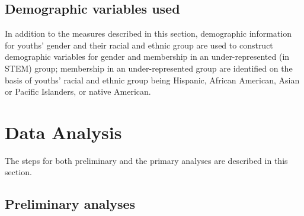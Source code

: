 \documentclass[]{book}
\theoremstyle{definition}
\theoremstyle{definition}
\theoremstyle{definition}
\theoremstyle{remark}
\begin{document}
\begin{table}

\caption{\label{tab:unnamed-chunk-6}Coding Frame for Work With Data}
\centering
{}
\end{table}

\subsection{Demographic variables
used}\label{demographic-variables-used}

In addition to the measures described in this section, demographic
information for youths' gender and their racial and ethnic group are
used to construct demographic variables for gender and membership in an
under-represented (in STEM) group; membership in an under-represented
group are identified on the basis of youths' racial and ethnic group
being Hispanic, African American, Asian or Pacific Islanders, or native
American.

\section{Data Analysis}\label{data-analysis}

The steps for both preliminary and the primary analyses are described in
this section.

\subsection{Preliminary analyses}\label{preliminary-analyses}
\end{document}
